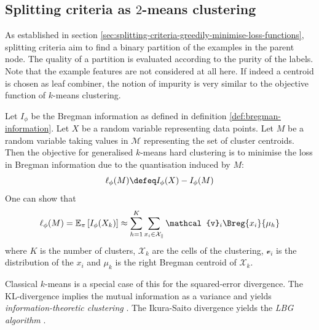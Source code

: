 \documentclass[../main.tex]{subfiles}
\begin{document}



\subsection{Splitting criteria as $2$-means clustering}



As established in section \ref{sec:splitting-criteria-greedily-minimise-loss-functions}, splitting criteria aim to find a binary partition of the examples in the parent node. The quality of a partition is evaluated according to the purity of the labels. Note that the example features are not considered at all here. If indeed a centroid is chosen as leaf combiner, the notion of impurity is very similar to the objective function of $k$-means clustering.

Let $I_{\phi}$ be the Bregman information as defined in definition \ref{def:bregman-information}. Let $X$ be a random variable representing data points. Let $M$ be a random variable taking values in $\mathcal{M}$ representing the set of cluster centroids. Then the objective for generalised $k$-means hard clustering \cite{banerjee} is to minimise the loss in Bregman information due to the quantisation induced by $M$:
$$
 \ell_{\phi}(M) \defeq I_{\phi}(X) - I_{\phi}(M)
$$
One can show \cite{banerjee} that
$$
\ell_{\phi}(M) = \mathbb{E}_{\pi}\left[ I_{\phi}(X_{k}) \right]  \approx \sum_{h=1}^K \sum_{x_{i} \in \mathcal{X_{k}}} \mathcal{v}_{i} \Breg{x_{i}}{\mu_{h}}
$$
where $K$ is the number of clusters, $\mathcal{X}_{k}$ are the cells of the clustering, $\mathcal{v}_{i}$ is the distribution of the $x_{i}$ and $\mu_{k}$ is the right Bregman centroid of $\mathcal{X}_{k}$.

Classical $k$-means is a special case of this for the squared-error divergence. The KL-divergence implies the mutual information as a variance and yields \textit{information-theoretic clustering} \cite{todo}. The Ikura-Saito divergence yields the \textit{LBG algorithm} \cite{todo}.
\end{document}

